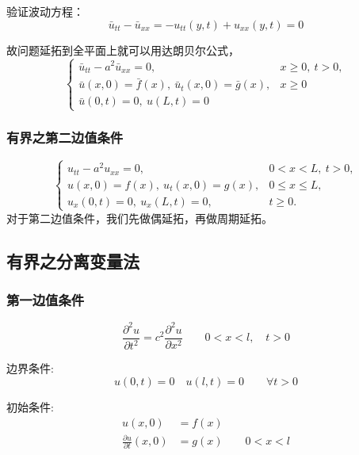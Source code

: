 \documentclass[12pt,a4paper]{article}
\numberwithin{subsection}{section}   %
\numberwithin{subsubsection}{subsection}
\theoremstyle{plain}
\theoremstyle{definition}
\theoremstyle{remark}
\theoremstyle{remark}
\begin{document}
验证波动方程：
\[
\bar{u}_{tt} - \bar{u}_{xx} = -u_{tt}(y, t) + u_{xx}(y, t) = 0
\]

故问题延拓到全平面上就可以用达朗贝尔公式，
\begin{equation*}
	\begin{cases}
		\bar{u}_{tt} - a^2 \bar{u}_{xx} = 0, & x \geq  0 , \ t > 0, \\
		\bar{u}(x, 0) = \bar{f}(x), \ \bar{u}_t(x, 0) = \bar{g}(x), & x \geq  0 \\
		\bar{u}(0, t) = 0, \ u(L, t) = 0
	\end{cases}
\end{equation*}

\subsubsection{有界之第二边值条件}
	\begin{equation}
		\begin{cases}
			u_{tt} - a^2 u_{xx} = 0, & 0 < x < L, \ t > 0, \\
			u(x, 0) = f(x), \ u_t(x, 0) = g(x), & 0 \leq x \leq L, \\
			u_x(0, t) = 0, \ u_x(L, t) = 0, & t \geq 0.
		\end{cases}
	\end{equation}
	对于第二边值条件，我们先做偶延拓，再做周期延拓。
	
	
	
	\subsection{有界之分离变量法}
	\subsubsection{第一边值条件}
	\begin{equation} \label{eq:wave_equation}
		\frac{\partial^2 u}{\partial t^2} = c^2 \frac{\partial^2 u}{\partial x^2} \qquad 0 < x < l, \quad t > 0
	\end{equation}
	
	边界条件:
	\begin{equation} \label{eq:boundary_conditions}
		u(0, t) = 0 \quad u(l, t) = 0 \qquad \forall t > 0
	\end{equation}
	
	初始条件:
	\begin{equation} \label{eq:initial_conditions}
		\begin{aligned}
			u(x, 0) &= f(x) \\
			\frac{\partial u}{\partial t}(x, 0) &= g(x) \qquad 0 < x < l
		\end{aligned}
	\end{equation}
	
\end{document}
